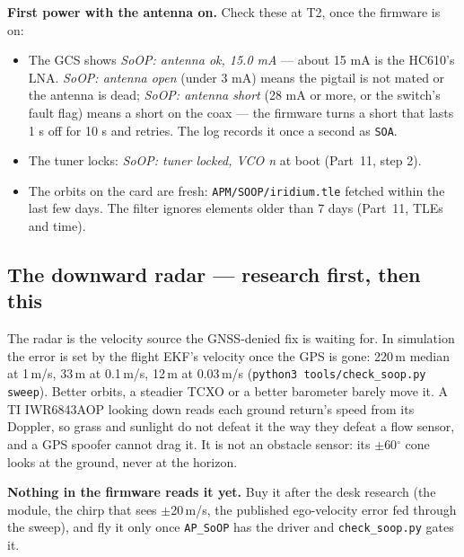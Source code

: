 \documentclass[11pt,a4paper]{article}
\newcommand{\file}[1]{\texttt{\small #1}}
\newcommand{\cmd}[1]{\texttt{\small #1}}
\newcommand{\flag}[1]{\textcolor{warnred}{\textbf{#1}}}
\begin{document}
\textbf{First power with the antenna on.} Check these at T2, once the firmware is on:
\begin{itemize}
\item The GCS shows \emph{SoOP: antenna ok, 15.0 mA} --- about 15 mA is the HC610's LNA.
\emph{SoOP: antenna open} (under 3 mA) means the pigtail is not mated or the antenna is
dead; \emph{SoOP: antenna short} (28 mA or more, or the switch's fault flag) means a short
on the coax --- the firmware turns a short that lasts 1 s off for 10 s and retries. The log
records it once a second as \file{SOA}.
\item The tuner locks: \emph{SoOP: tuner locked, VCO n} at boot (Part~11, step 2).
\item The orbits on the card are fresh: \file{APM/SOOP/iridium.tle} fetched within the
last few days. The filter ignores elements older than 7 days (Part~11, TLEs and time).
\end{itemize}

\subsection{The downward radar --- research first, then this}

The radar is the velocity source the GNSS-denied fix is waiting for. In simulation the error is
set by the flight EKF's velocity once the GPS is gone: 220\,m median at 1\,m/s, 33\,m at
0.1\,m/s, 12\,m at 0.03\,m/s (\cmd{python3 tools/check\_soop.py sweep}). Better orbits, a
steadier TCXO or a better barometer barely move it. A TI IWR6843AOP looking down reads each
ground return's speed from its Doppler, so grass and sunlight do not defeat it the way they
defeat a flow sensor, and a GPS spoofer cannot drag it. It is not an obstacle sensor: its
$\pm$60$^\circ$ cone looks at the ground, never at the horizon.

\flag{Nothing in the firmware reads it yet.} Buy it after the desk research (the module, the
chirp that sees $\pm$20\,m/s, the published ego-velocity error fed through the sweep), and
fly it only once \file{AP\_SoOP} has the driver and \file{check\_soop.py} gates it.
\end{document}
